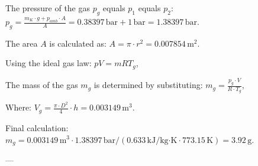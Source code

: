 The pressure of the gas \( p_g \) equals \( p_1 \) equals \( p_2 \):  
\( p_g = \frac{m_K \cdot g + p_{amb} \cdot A}{A} = 0.38397 \, \text{bar} + 1 \, \text{bar} = 1.38397 \, \text{bar} \).  

The area \( A \) is calculated as:  
\( A = \pi \cdot r^2 = 0.007854 \, \text{m}^2 \).  

Using the ideal gas law:  
\( pV = mRT_g \),  

The mass of the gas \( m_g \) is determined by substituting:  
\( m_g = \frac{p_g \cdot V}{R \cdot T_g} \),  

Where:  
\( V_g = \frac{\pi \cdot D^2}{4} \cdot h = 0.003149 \, \text{m}^3 \).  

Final calculation:  
\( m_g = 0.003149 \, \text{m}^3 \cdot 1.38397 \, \text{bar} / (0.633 \, \text{kJ/kg·K} \cdot 773.15 \, \text{K}) = 3.92 \, \text{g} \).  

---